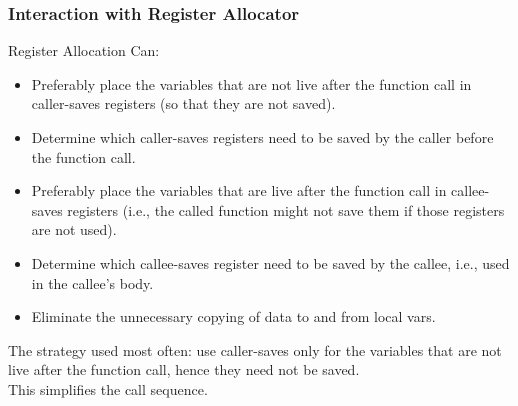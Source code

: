\documentclass{beamer}
\newcommand{\emp}[1]{\textcolor{DikuRed}{ #1}}
\begin{document}
\begin{frame}
\frametitle{Interaction with Register Allocator}

Register Allocation Can:\smallskip

\begin{itemize}
\item Preferably place the variables that are not live after the function
        call in caller-saves registers (so that they are not saved).\smallskip

\item Determine which caller-saves registers need to be saved by the
        caller before the function call.\smallskip\pause

\item Preferably place the variables that are live after the function call
        in callee-saves registers (i.e., the called function might not save
        them if those registers are not used).\smallskip

\item Determine which callee-saves register need to be saved by the
        callee, i.e., used in the callee's body.\smallskip


\item Eliminate the unnecessary copying of data to and from local vars.

\end{itemize}

\bigskip

The strategy used most often: \pause use caller-saves only for the variables
that are not live after the function call, hence they need not be saved.\\\smallskip
This simplifies \emp{the call sequence}.

\end{frame}
\end{document}
